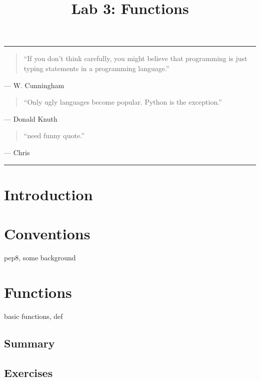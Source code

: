 \documentclass[11pt]{cselabheader}
\title{Lab 3: Functions}
\begin{document}
\maketitle

\hrule
\begin{quotation}
  ``If you don't think carefully, you might believe that programming is just
  typing statements in a programming language.''
\end{quotation}
\begin{flushright}
  --- W. Cunningham
\end{flushright}

\begin{quotation}
  ``Only ugly languages become popular. Python is the exception.''
\end{quotation}
\begin{flushright}
  --- Donald Knuth
\end{flushright}

\begin{quotation}
  ``need funny quote.''
\end{quotation}
\begin{flushright}
  --- Chris
\end{flushright}

\hrule

\section{Introduction}
\label{sec:intro}

\section{Conventions}
\label{sec:pep8}

pep8, some background

\section{Functions}
\label{sec:funcs}

basic functions, def

\subsection{Summary}
\label{subsec:funcs.sum}

\subsection{Exercises}
\label{subsec:funcs.ex}
\end{document}
